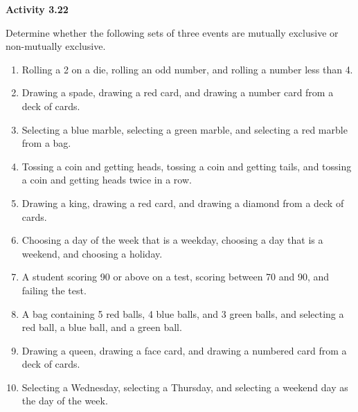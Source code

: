 \vspace{0.3ex}
\noindent\textbf{Activity 3.22}

\vspace{0.2ex}

Determine whether the following sets of three events are mutually exclusive or non-mutually exclusive.

\begin{enumerate}[label=\color{blue}\arabic*.]
    \item Rolling a 2 on a die, rolling an odd number, and rolling a number less than 4.
    \item Drawing a spade, drawing a red card, and drawing a number card from a deck of cards.
    \item Selecting a blue marble, selecting a green marble, and selecting a red marble from a bag.
    \item Tossing a coin and getting heads, tossing a coin and getting tails, and tossing a coin and getting heads twice in a row.
    \item Drawing a king, drawing a red card, and drawing a diamond from a deck of cards.
    \item Choosing a day of the week that is a weekday, choosing a day that is a weekend, and choosing a holiday.
    \item A student scoring 90 or above on a test, scoring between 70 and 90, and failing the test.
    \item A bag containing 5 red balls, 4 blue balls, and 3 green balls, and selecting a red ball, a blue ball, and a green ball.
    \item Drawing a queen, drawing a face card, and drawing a numbered card from a deck of cards.
    \item Selecting a Wednesday, selecting a Thursday, and selecting a weekend day as the day of the week.
\end{enumerate}
